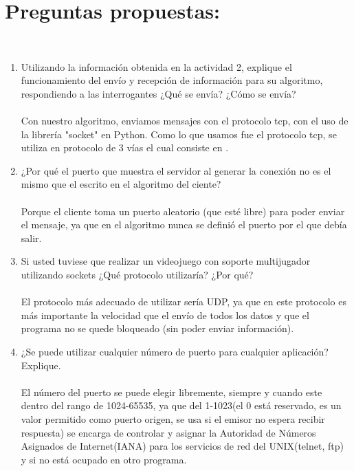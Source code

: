 \documentclass{udpreport}
\begin{document}
	\chapter{Preguntas propuestas:}	\\
	\begin{enumerate}
	    \item Utilizando la información obtenida en la actividad 2, explique el funcionamiento del envío y recepción
    de información para su algoritmo, respondiendo a las interrogantes ¿Qué se envía? ¿Cómo se envía?\\\\
        Con nuestro algoritmo, enviamos mensajes con el protocolo tcp, con el uso de la librería "socket" en Python.
        Como lo que usamos fue el protocolo tcp, se utiliza en protocolo de 3 vías el cual consiste en .\\
        \item ¿Por qué el puerto que muestra el servidor al generar la conexión no es el mismo que el escrito en el
    algoritmo del ciente?\\\\
                       Porque el cliente toma un puerto aleatorio (que esté libre) para poder enviar el mensaje, 
                       ya que en el algoritmo nunca se definió el puerto por el que debía salir.\\ 
                                            
        \item Si usted tuviese que realizar un videojuego con soporte multijugador utilizando sockets ¿Qué protocolo
    utilizaría? ¿Por qué? \\\\  
            El protocolo más adecuado de utilizar sería UDP, ya que en este protocolo es más importante la velocidad 
            que el envío de todos los datos y que el programa no se quede bloqueado (sin poder enviar información).\\
                                          
        \item¿Se puede utilizar cualquier número de puerto para cualquier aplicación? Explique.\\\\
            El número del puerto se puede elegir libremente, siempre y cuando este dentro del rango de 1024-65535,
            ya que del 1-1023(el 0 está reservado, es un valor permitido como puerto origen, se usa si el emisor no espera
            recibir respuesta) se encarga de controlar y asignar la  Autoridad de Números Asignados de Internet(IANA) para 
            los servicios de red del UNIX(telnet, ftp) y si no está ocupado en otro programa.\\
        \newpage

	\end{enumerate}
\end{document}
